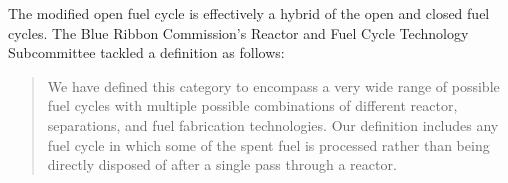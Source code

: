 The modified open fuel cycle is effectively a hybrid of the open and closed fuel
cycles. The Blue Ribbon Commission's Reactor and Fuel Cycle
Technology Subcommittee tackled a definition as follows:

\begin{quotation}
We have defined this category to encompass a very wide range of possible fuel
cycles with multiple possible combinations of different reactor, separations,
and fuel fabrication technologies. Our definition includes any fuel cycle in
which some of the spent fuel is processed rather than being directly disposed of
after a single pass through a reactor.~\cite{brc_reactor_2012}
\end{quotation}
